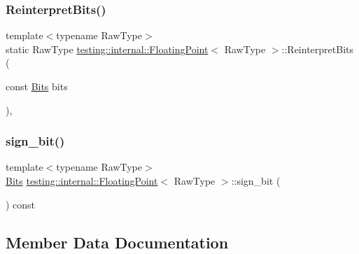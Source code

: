 \subsubsection{\texorpdfstring{ReinterpretBits()}{ReinterpretBits()}}
{\footnotesize\ttfamily template$<$typename Raw\+Type$>$ \\
static Raw\+Type \mbox{\hyperlink{classtesting_1_1internal_1_1_floating_point}{testing\+::internal\+::\+Floating\+Point}}$<$ Raw\+Type $>$\+::Reinterpret\+Bits (\begin{DoxyParamCaption}\item[{const \mbox{\hyperlink{classtesting_1_1internal_1_1_floating_point_abf228bf6cd48f12c8b44c85b4971a731}{Bits}}}]{bits }\end{DoxyParamCaption})\hspace{0.3cm}{\ttfamily [inline]}, {\ttfamily [static]}}

\mbox{\label{classtesting_1_1internal_1_1_floating_point_afb8a816bb598225d775caaf43a893ef0}} 
\subsubsection{\texorpdfstring{sign\_bit()}{sign\_bit()}}
{\footnotesize\ttfamily template$<$typename Raw\+Type$>$ \\
\mbox{\hyperlink{classtesting_1_1internal_1_1_floating_point_abf228bf6cd48f12c8b44c85b4971a731}{Bits}} \mbox{\hyperlink{classtesting_1_1internal_1_1_floating_point}{testing\+::internal\+::\+Floating\+Point}}$<$ Raw\+Type $>$\+::sign\+\_\+bit (\begin{DoxyParamCaption}{ }\end{DoxyParamCaption}) const\hspace{0.3cm}{\ttfamily [inline]}}



\subsection{Member Data Documentation}
\mbox{\label{classtesting_1_1internal_1_1_floating_point_ab819d2e8f93e9e482373999f0f8d71b9}} 
